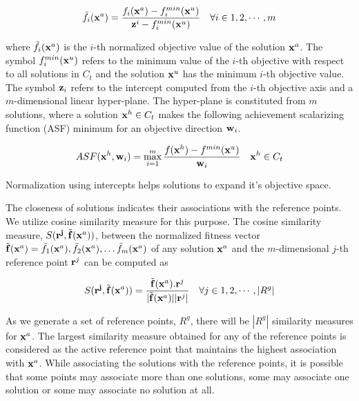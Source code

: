 \documentclass[review]{elsarticle}
\begin{document}
\begin{equation} \label{eq:normalizedEquation}
	\tilde{f}_i({\bf x}^a) = \frac{f_i({\bf x}^a) - f_i^{min}({\bf x}^u)}{{\bf z}^i-f_i^{min}({\bf x}^u)} \ \ \ \forall i \in {1,2,\cdots, m}
\end{equation}

\noindent where $\tilde{f}_i({\bf x}^a)$ is the $i$-th normalized objective value of the solution ${\bf x}^a$. The symbol
$f_i^{min}({\bf x}^u)$ refers to the minimum value of the $i$-th objective with respect to all solutions in $C_t$ and 
the solution ${\bf x}^u$ has the minimum $i$-th objective value. The symbol ${\bf z}_i$ refers to the intercept computed 
from the $i$-th objective axis and a $m$-dimensional linear hyper-plane.
The  hyper-plane is constituted from $m$ solutions, where a solution ${\bf x}^h\in C_t$ makes the following achievement scalarizing function (ASF) minimum for an objective direction ${\bf w}_i$.

\begin{equation} \label{eq:achievementfunction}
	ASF({\bf x}^h, {\bf w}_i) = \max_{i=1}^{m} \frac{f({\bf x}^h)-f^{min}({\bf x}^u)}{{\bf w}_i} \ \ \ {\bf x}^h\in C_t
\end{equation}

\noindent Normalization using intercepts helps solutions to expand it's objective space.

The closeness of solutions indicates their associations with the reference points. We  utilize cosine similarity measure for this purpose. The cosine similarity measure, $S(\mathbf{r^j},\tilde{\bf f}({\bf x}^a))$, between the normalized fitness vector $\tilde{\bf f}({\bf x}^a) = \tilde{f}_1({\bf x}^a), \tilde{f}_2({\bf x}^a), \ldots \tilde{f}_m({\bf x}^a)$ of any solution ${\bf x}^a$ and the $m$-dimensional $j$-th reference point ${\bf r}^j$  can be computed as

\begin{equation} \label{eq:cosineSim}
	S(\mathbf{r^j},\tilde{\bf f}({\bf x}^a))=\frac{\tilde{\bf f}({\bf x}^a) . {\bf r}^j}{|\tilde{\bf f}({\bf x}^a)||{\bf r}^j|} \ \ \  \forall j \in {1, 2, \cdots, \left|R^g\right|}
\end{equation}

\noindent %
As we generate a set of reference points, $R^g$, there will be $\left|R^g\right|$ similarity measures for 
${\bf x}^a$. The largest similarity measure obtained for any of the  reference points is considered as the active reference point that maintains the highest association with ${\bf x}^a$. %
While associating the solutions with the reference points, it is possible that some points may associate more than one solutions, some may associate one solution or some may associate no solution at all. %
\end{document}
